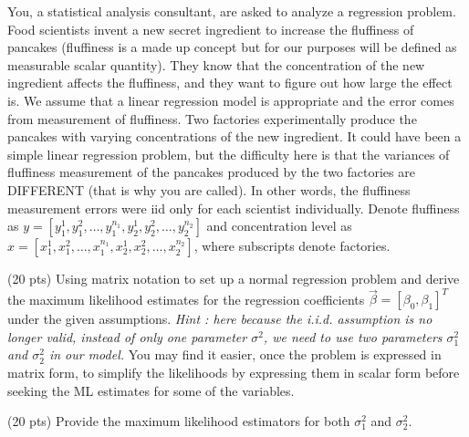 \documentclass[12pt]{article}
\begin{document}
{
You, a statistical analysis consultant, are asked to analyze a regression problem. Food scientists invent a new secret ingredient to increase the fluffiness of pancakes (fluffiness is a made up concept but for our purposes will be defined as measurable scalar quantity). They know that the concentration of the new ingredient affects the fluffiness, and they want to figure out how large the effect is. We assume that a linear regression model is appropriate and the error comes from measurement of fluffiness. Two factories experimentally produce the pancakes with varying concentrations of the new ingredient. It could have been a simple linear regression problem, but the difficulty here is that the variances of fluffiness measurement of the pancakes produced by the two factories are DIFFERENT (that is why you are called). In other words, the fluffiness measurement errors were iid only for each scientist individually. Denote fluffiness as $y=[y_1^1,y_1^2,\ldots,y_1^{n_1}, y_2^1,y_2^2,\ldots,y_2^{n_2}]$ and concentration level as $x=[x_1^1,x_1^2,\ldots,x_1^{n_1}, x_2^1,x_2^2,\ldots,x_2^{n_2}]$, where subscripts denote factories. 

\abcs 
\item (20 pts) Using matrix notation to set up a normal regression problem and derive the maximum likelihood estimates for the regression coefficients $\vec \beta = [\beta_0, \beta_1]^T$ under the given assumptions.  {\em Hint : here because the i.i.d. assumption is no longer valid, instead of only one parameter $\sigma^2$, we need to use two parameters $\sigma_1^2$ and $\sigma_2^2$ in our model.}  You may find it easier, once the problem is expressed in matrix form, to simplify the likelihoods by expressing them in scalar form before seeking the ML estimates for some of the variables.
\item (20 pts) Provide the maximum likelihood estimators for both $\sigma^2_1$ and $\sigma^2_2.$
\endabcs
}
{
\vfill
\newpage
}
{
}







\problemsdone
\end{document}
